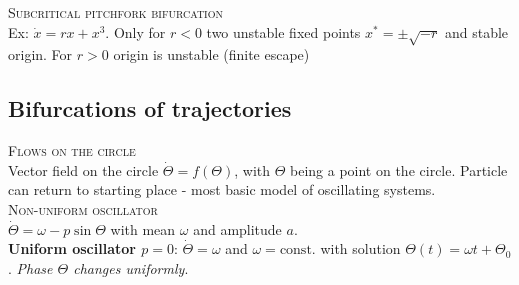 \textsc{Subcritical pitchfork bifurcation}\\
Ex: $\dot{x}=rx+x^3$. Only for $r<0$ two unstable fixed points $x^*=\pm \sqrt{-r}$ and stable origin. For $r>0$ origin is unstable (finite escape)
\begin{center}
\end{center}


\subsection{Bifurcations of trajectories}
\textsc{Flows on the circle}\\
Vector field on the circle $\dot{\Theta}=f(\Theta)$, with $\Theta$ being a point on the circle. Particle can return to starting place - most basic model of oscillating systems.\\

\textsc{Non-uniform oscillator}\\
$\dot{\Theta} = \omega - p\sin \Theta$ with mean $\omega$ and amplitude $a$.\\
\textbf{Uniform oscillator $p=0$}: $\dot{\Theta} = \omega$ and $\omega=\text{const.}$ with solution $\Theta(t)=\omega t + \Theta_0$. \emph{Phase $\Theta$ changes uniformly}.\\

